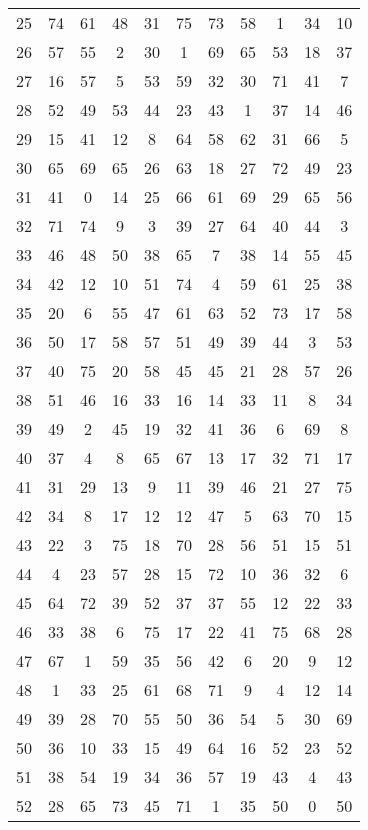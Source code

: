 \begin{table}
\begin{tabular}{c c c c c c c c c c c }
25 & 74 & 61 & 48 & 31 & 75 & 73 & 58 & 1 & 34 & 10 \\
26 & 57 & 55 & 2 & 30 & 1 & 69 & 65 & 53 & 18 & 37 \\
27 & 16 & 57 & 5 & 53 & 59 & 32 & 30 & 71 & 41 & 7 \\
28 & 52 & 49 & 53 & 44 & 23 & 43 & 1 & 37 & 14 & 46 \\
29 & 15 & 41 & 12 & 8 & 64 & 58 & 62 & 31 & 66 & 5 \\
30 & 65 & 69 & 65 & 26 & 63 & 18 & 27 & 72 & 49 & 23 \\
31 & 41 & 0 & 14 & 25 & 66 & 61 & 69 & 29 & 65 & 56 \\
32 & 71 & 74 & 9 & 3 & 39 & 27 & 64 & 40 & 44 & 3 \\
33 & 46 & 48 & 50 & 38 & 65 & 7 & 38 & 14 & 55 & 45 \\
34 & 42 & 12 & 10 & 51 & 74 & 4 & 59 & 61 & 25 & 38 \\
35 & 20 & 6 & 55 & 47 & 61 & 63 & 52 & 73 & 17 & 58 \\
36 & 50 & 17 & 58 & 57 & 51 & 49 & 39 & 44 & 3 & 53 \\
37 & 40 & 75 & 20 & 58 & 45 & 45 & 21 & 28 & 57 & 26 \\
38 & 51 & 46 & 16 & 33 & 16 & 14 & 33 & 11 & 8 & 34 \\
39 & 49 & 2 & 45 & 19 & 32 & 41 & 36 & 6 & 69 & 8 \\
40 & 37 & 4 & 8 & 65 & 67 & 13 & 17 & 32 & 71 & 17 \\
41 & 31 & 29 & 13 & 9 & 11 & 39 & 46 & 21 & 27 & 75 \\
42 & 34 & 8 & 17 & 12 & 12 & 47 & 5 & 63 & 70 & 15 \\
43 & 22 & 3 & 75 & 18 & 70 & 28 & 56 & 51 & 15 & 51 \\
44 & 4 & 23 & 57 & 28 & 15 & 72 & 10 & 36 & 32 & 6 \\
45 & 64 & 72 & 39 & 52 & 37 & 37 & 55 & 12 & 22 & 33 \\
46 & 33 & 38 & 6 & 75 & 17 & 22 & 41 & 75 & 68 & 28 \\
47 & 67 & 1 & 59 & 35 & 56 & 42 & 6 & 20 & 9 & 12 \\
48 & 1 & 33 & 25 & 61 & 68 & 71 & 9 & 4 & 12 & 14 \\
49 & 39 & 28 & 70 & 55 & 50 & 36 & 54 & 5 & 30 & 69 \\
50 & 36 & 10 & 33 & 15 & 49 & 64 & 16 & 52 & 23 & 52 \\
51 & 38 & 54 & 19 & 34 & 36 & 57 & 19 & 43 & 4 & 43 \\
52 & 28 & 65 & 73 & 45 & 71 & 1 & 35 & 50 & 0 & 50 \\

\end{tabular}
\end{table}
